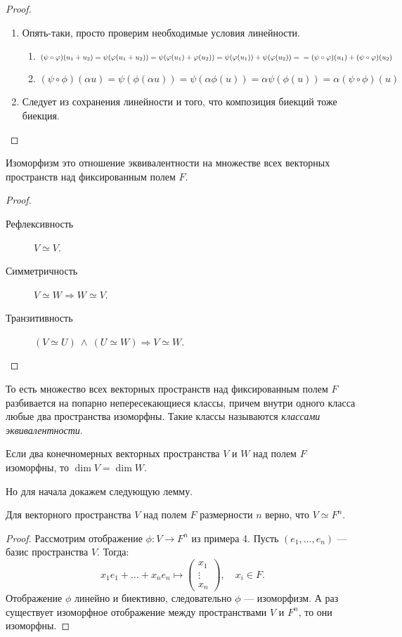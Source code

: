 \begin{proof} \ 
\begin{enumerate}
\item Опять-таки, просто проверим необходимые условия линейности.
\begin{enumerate}
\item $(\psi \circ \phi)(u_1 + u_2) = \psi(\phi(u_1 + u_2)) = \psi(\phi(u_1) + \phi(u_2)) = \psi(\phi(u_1)) + \psi(\phi(u_2)) = \\ = (\psi \circ\phi)(u_1) + (\psi \circ \phi)(u_2)$
\item $(\psi \circ \phi)(\alpha u) = \psi(\phi(\alpha u)) = \psi(\alpha\phi(u)) = \alpha \psi(\phi(u)) = \alpha (\psi \circ \phi) (u)$
\end{enumerate}
\item Следует из сохранения линейности и того, что композиция биекций тоже биекция.
\end{enumerate}
\end{proof}

\begin{Consequence}
Изоморфизм это отношение эквивалентности на множестве всех векторных пространств над фиксированным полем $F$.
\end{Consequence}
\begin{proof} \ 
\begin{description}
\item[Рефлексивность] $V \simeq V$.
\item[Симметричность] $V \simeq W \Rightarrow W \simeq V$.
\item[Транзитивность] $(V \simeq U)\ \land\ (U \simeq W) \Rightarrow V \simeq W$.
\end{description}
\end{proof}

То есть множество всех векторных пространств над фиксированным полем $F$ разбивается на попарно непересекающиеся классы, причем внутри одного класса любые два пространства изоморфны. Такие классы называются \textit{классами эквивалентности}.

\begin{Theorem}
Если два конечномерных векторных пространства $V$ и $W$ над полем $F$ изоморфны, то $\dim V = \dim W$.
\end{Theorem}

Но для начала докажем следующую лемму.

\begin{Lemma}[1]
Для векторного пространства $V$ над полем $F$ размерности $n$ верно, что $V \simeq F^n$.
\end{Lemma}
\begin{proof}
Рассмотрим отображение $\phi: V \rightarrow F^n$ из примера 4. Пусть $(e_1, \ldots, e_n)$ --- базис пространства $V$. Тогда:
\[
x_1e_1 + \ldots + x_ne_n \mapsto 
\begin{pmatrix*}
x_1 \\
\vdots \\
x_n
\end{pmatrix*}, \quad x_i \in F.
\]
Отображение $\phi$ линейно и биективно, следовательно $\phi$ --- изоморфизм. А раз существует изоморфное отображение между пространствами $V$ и $F^n$, то они изоморфны.
\end{proof}



